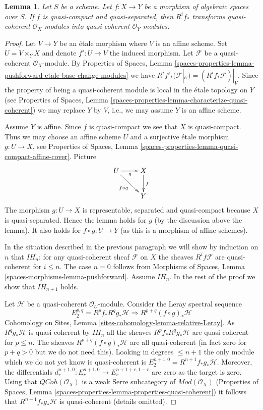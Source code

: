 \documentclass{stacks-project}
\theoremstyle{plain}
\newtheorem{lemma}[subsection]{Lemma}
\theoremstyle{definition}
\theoremstyle{remark}
\numberwithin{equation}{subsection}
\def\QCoh{\mathit{QCoh}}
\begin{document}
\begin{lemma}
\label{lemma-higher-direct-image}
Let $S$ be a scheme. Let $f : X \to Y$ be a morphism of algebraic spaces
over $S$. If $f$ is quasi-compact and quasi-separated, then $R^if_*$
transforms quasi-coherent $\mathcal{O}_X$-modules into
quasi-coherent $\mathcal{O}_Y$-modules.
\end{lemma}

\begin{proof}
Let $V \to Y$ be an \'etale morphism where $V$ is an affine scheme. Set
$U = V \times_Y X$ and denote $f' : U \to V$ the induced morphism.
Let $\mathcal{F}$ be a quasi-coherent $\mathcal{O}_X$-module. By
Properties of Spaces, Lemma
\ref{spaces-properties-lemma-pushforward-etale-base-change-modules}
we have
$R^if'_*(\mathcal{F}|_U) = (R^if_*\mathcal{F})|_V$.
Since the property of being a quasi-coherent module is local in the
\'etale topology on $Y$ (see
Properties of Spaces, Lemma
\ref{spaces-properties-lemma-characterize-quasi-coherent})
we may replace $Y$ by $V$, i.e., we may assume $Y$ is an affine scheme.

\medskip\noindent
Assume $Y$ is affine. Since $f$ is quasi-compact we see that $X$
is quasi-compact. Thus we may choose an affine scheme $U$ and a surjective
\'etale morphism $g : U \to X$, see
Properties of Spaces,
Lemma \ref{spaces-properties-lemma-quasi-compact-affine-cover}.
Picture
$$
\xymatrix{
U \ar[r]_g \ar[rd]_{f \circ g} & X \ar[d]^f \\
& Y
}
$$
The morphism $g : U \to X$ is representable, separated
and quasi-compact because $X$ is quasi-separated. Hence the lemma
holds for $g$ (by the discussion above the lemma).
It also holds for $f \circ g : U \to Y$ (as this is a morphism
of affine schemes).

\medskip\noindent
In the situation described in the previous paragraph we will show by
induction on $n$ that $IH_n$: for any quasi-coherent sheaf $\mathcal{F}$
on $X$ the sheaves $R^if\mathcal{F}$
are quasi-coherent for $i \leq n$.
The case $n = 0$ follows from
Morphisms of Spaces, Lemma \ref{spaces-morphisms-lemma-pushforward}.
Assume $IH_n$. In the rest of the proof we show that $IH_{n + 1}$ holds.

\medskip\noindent
Let $\mathcal{H}$ be a quasi-coherent $\mathcal{O}_U$-module.
Consider the Leray spectral sequence
$$
E_2^{p, q} = R^pf_* R^qg_* \mathcal{H}
\Rightarrow
R^{p + q}(f \circ g)_*\mathcal{H}
$$
Cohomology on Sites, Lemma \ref{sites-cohomology-lemma-relative-Leray}.
As $R^qg_*\mathcal{H}$ is quasi-coherent by $IH_n$ all the sheaves
$R^pf_*R^qg_*\mathcal{H}$ are quasi-coherent for $p \leq n$.
The sheaves $R^{p + q}(f \circ g)_*\mathcal{H}$ are all
quasi-coherent (in fact zero for $p + q > 0$ but we do not need this).
Looking in degrees $\leq n + 1$ the only module which we do not
yet know is quasi-coherent is $E_2^{n + 1, 0} = R^{n + 1}f_*g_*\mathcal{H}$.
Moreover, the differentials
$d_r^{n + 1, 0} : E_r^{n + 1, 0} \to E_r^{n + 1 + r, 1 - r}$
are zero as the target is zero. Using that $\QCoh(\mathcal{O}_X)$
is a weak Serre subcategory of $\textit{Mod}(\mathcal{O}_X)$
(Properties of Spaces, Lemma
\ref{spaces-properties-lemma-properties-quasi-coherent}) it
follows that $R^{n + 1}f_*g_*\mathcal{H}$
is quasi-coherent (details omitted).


\end{proof}
\end{document}
